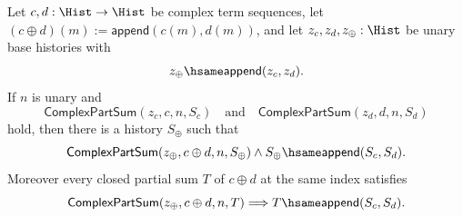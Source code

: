 \begin{theorem}
\label{thm:complex-part-sum-pointwise-addition}
Let $c,d:\Hist\to\Hist$ be complex term sequences, let $(c\oplus d)(m):=\mathsf{append}(c(m),d(m))$, and let $z_c,z_d,z_\oplus:\Hist$ be unary base histories with
$$
z_\oplus\hsame\mathsf{append}(z_c,z_d).
$$
If $n$ is unary and
$$
\mathsf{ComplexPartSum}(z_c,c,n,S_c)
\quad\text{and}\quad
\mathsf{ComplexPartSum}(z_d,d,n,S_d)
$$
hold, then there is a history $S_\oplus$ such that
$$
\mathsf{ComplexPartSum}(z_\oplus,c\oplus d,n,S_\oplus)
\land
S_\oplus\hsame\mathsf{append}(S_c,S_d).
$$
Moreover every closed partial sum $T$ of $c\oplus d$ at the same index satisfies
$$
\mathsf{ComplexPartSum}(z_\oplus,c\oplus d,n,T)
\Longrightarrow
T\hsame\mathsf{append}(S_c,S_d).
$$
\end{theorem}
